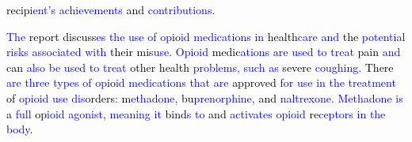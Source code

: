 \begin{tcolorbox}
\textcolor{black}{recip}\textcolor{blue}{ient}\textcolor{blue}{'}\textcolor{blue}{s} \textcolor{blue}{achiev}\textcolor{blue}{ements} \textcolor{black}{and} \textcolor{blue}{contributions}\textcolor{blue}{.}
\end{tcolorbox}
\newpage

\begin{tcolorbox}
  \textcolor{blue}{The} \textcolor{black}{report} \textcolor{black}{discuss}\textcolor{blue}{es} \textcolor{blue}{the} \textcolor{blue}{use} \textcolor{blue}{of} \textcolor{blue}{op}\textcolor{black}{io}\textcolor{blue}{id} \textcolor{blue}{medic}\textcolor{blue}{ations} \textcolor{blue}{in} \textcolor{black}{health}\textcolor{blue}{care} \textcolor{blue}{and} \textcolor{black}{the} \textcolor{blue}{potential} \textcolor{blue}{ris}\textcolor{blue}{ks} \textcolor{blue}{associated} \textcolor{blue}{with} \textcolor{black}{their} \textcolor{black}{mis}\textcolor{blue}{use}\textcolor{blue}{.} \textcolor{blue}{Op}\textcolor{blue}{io}\textcolor{blue}{id} \textcolor{black}{medic}\textcolor{blue}{ations} \textcolor{blue}{are} \textcolor{blue}{used} \textcolor{blue}{to} \textcolor{blue}{treat} \textcolor{black}{pain} \textcolor{blue}{and} \textcolor{black}{can} \textcolor{blue}{also} \textcolor{blue}{be} \textcolor{blue}{used} \textcolor{blue}{to} \textcolor{blue}{treat} \textcolor{black}{other} \textcolor{black}{health} \textcolor{blue}{problems}\textcolor{blue}{,} \textcolor{blue}{such} \textcolor{blue}{as} \textcolor{black}{severe} \textcolor{blue}{c}\textcolor{blue}{ough}\textcolor{blue}{ing}\textcolor{blue}{.} \textcolor{black}{There} \textcolor{blue}{are} \textcolor{blue}{three} \textcolor{blue}{types} \textcolor{blue}{of} \textcolor{blue}{op}\textcolor{black}{io}\textcolor{blue}{id} \textcolor{blue}{medic}\textcolor{blue}{ations} \textcolor{blue}{that} \textcolor{blue}{are} \textcolor{black}{approved} \textcolor{blue}{for} \textcolor{blue}{use} \textcolor{blue}{in} \textcolor{blue}{the} \textcolor{blue}{treatment} \textcolor{black}{of} \textcolor{blue}{op}\textcolor{blue}{io}\textcolor{blue}{id} \textcolor{blue}{use} \textcolor{blue}{dis}\textcolor{black}{orders}\textcolor{blue}{:} \textcolor{black}{m}\textcolor{blue}{eth}\textcolor{blue}{ad}\textcolor{blue}{one}\textcolor{blue}{,} \textcolor{black}{bu}\textcolor{blue}{pr}\textcolor{blue}{en}\textcolor{blue}{orph}\textcolor{blue}{ine}\textcolor{blue}{,} \textcolor{black}{and} \textcolor{blue}{n}\textcolor{blue}{alt}\textcolor{blue}{re}\textcolor{blue}{x}\textcolor{blue}{one}\textcolor{black}{.} \textcolor{blue}{M}\textcolor{blue}{eth}\textcolor{blue}{ad}\textcolor{blue}{one} \textcolor{blue}{is} \textcolor{black}{a} \textcolor{blue}{full} \textcolor{black}{op}\textcolor{blue}{io}\textcolor{blue}{id} \textcolor{blue}{ag}\textcolor{blue}{on}\textcolor{blue}{ist}\textcolor{black}{,} \textcolor{blue}{meaning} \textcolor{blue}{it} \textcolor{black}{bind}\textcolor{blue}{s} \textcolor{blue}{to} \textcolor{black}{and} \textcolor{blue}{activ}\textcolor{blue}{ates} \textcolor{blue}{op}\textcolor{blue}{io}\textcolor{blue}{id} \textcolor{black}{re}\textcolor{blue}{cept}\textcolor{blue}{ors} \textcolor{blue}{in} \textcolor{blue}{the} \textcolor{blue}{body}\textcolor{black}{.} 
\end{tcolorbox}
